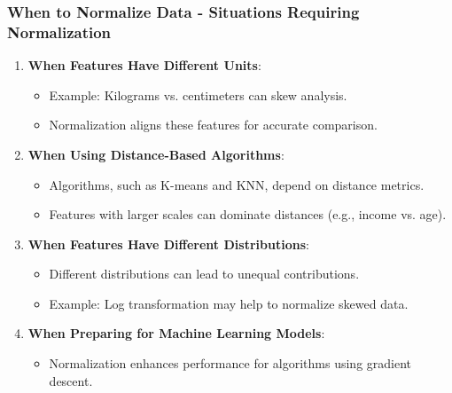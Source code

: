 \documentclass[aspectratio=169]{beamer}
\begin{document}
\begin{frame}[fragile]
    \frametitle{When to Normalize Data - Situations Requiring Normalization}
    \begin{enumerate}
        \item \textbf{When Features Have Different Units}:
        \begin{itemize}
            \item Example: Kilograms vs. centimeters can skew analysis.
            \item Normalization aligns these features for accurate comparison.
        \end{itemize}
        
        \item \textbf{When Using Distance-Based Algorithms}:
        \begin{itemize}
            \item Algorithms, such as K-means and KNN, depend on distance metrics.
            \item Features with larger scales can dominate distances (e.g., income vs. age).
        \end{itemize}
        
        \item \textbf{When Features Have Different Distributions}:
        \begin{itemize}
            \item Different distributions can lead to unequal contributions.
            \item Example: Log transformation may help to normalize skewed data.
        \end{itemize}
        
        \item \textbf{When Preparing for Machine Learning Models}:
        \begin{itemize}
            \item Normalization enhances performance for algorithms using gradient descent.
        \end{itemize}
    \end{enumerate}
\end{frame}
\end{document}
